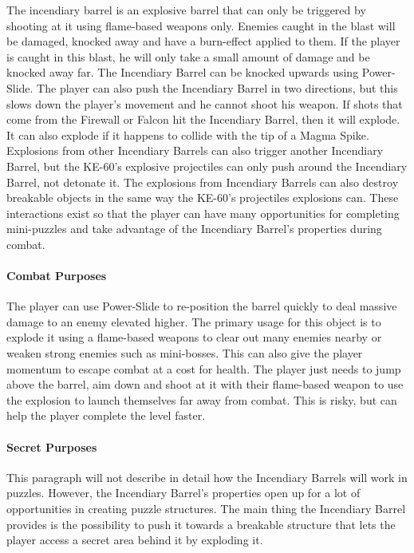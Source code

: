 \documentclass[12pt]{article}
\begin{document}
The incendiary barrel is an explosive barrel that can only be triggered by shooting at it using flame-based weapons only. Enemies caught in the blast will be damaged, knocked away and have a burn-effect applied to them. If the player is caught in this blast, he will only take a small amount of damage and be knocked away far. The Incendiary Barrel can be knocked upwards using Power-Slide. The player can also push the Incendiary Barrel in two directions, but this slows down the player's movement and he cannot shoot his weapon. If shots that come from the Firewall or Falcon hit the Incendiary Barrel, then it will explode. It can also explode if it happens to collide with the tip of a Magma Spike. Explosions from other Incendiary Barrels can also trigger another Incendiary Barrel, but the KE-60's explosive projectiles can only push around the Incendiary Barrel, not detonate it. The explosions from Incendiary Barrels can also destroy breakable objects in the same way the KE-60's projectiles explosions can. These interactions exist so that the player can have many opportunities for completing mini-puzzles and take advantage of the Incendiary Barrel's properties during combat. 

\paragraph{Combat Purposes}

The player can use Power-Slide to re-position the barrel quickly to deal massive damage to an enemy elevated higher. The primary usage for this object is to explode it using a flame-based weapons to clear out many enemies nearby or weaken strong enemies such as mini-bosses. This can also give the player momentum to escape combat at a cost for health. The player just needs to jump above the barrel, aim down and shoot at it with their flame-based weapon to use the explosion to launch themselves far away from combat. This is risky, but can help the player complete the level faster. 

\paragraph{Secret Purposes}

This paragraph will not describe in detail how the Incendiary Barrels will work in puzzles. However, the Incendiary Barrel's properties open up for a lot of opportunities in creating puzzle structures. The main thing the Incendiary Barrel provides is the possibility to push it towards a breakable structure that lets the player access a secret area behind it by exploding it. 
\end{document}
